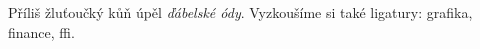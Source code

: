 \documentclass{article}
\begin{document}
Příliš žluťoučký kůň úpěl \textit{ďábelské ódy}. 
Vyzkoušíme si také ligatury: grafika, finance, ffi.
\end{document}
